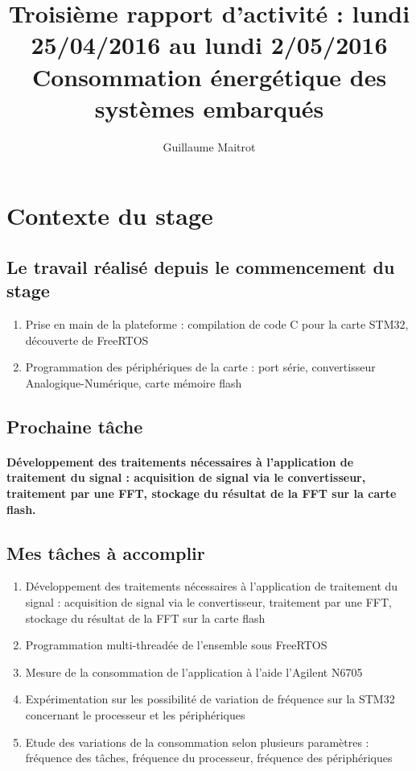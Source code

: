 \documentclass[a4paper]{article}
\title{Troisième rapport d'activité : lundi 25/04/2016 au lundi 2/05/2016 }
\author{Guillaume Maitrot}
\begin{document}
\maketitle

\begin{center}
\centering
\title{Consommation énergétique des systèmes embarqués}
\end{center}

\section{Contexte du stage}

 \subsection{Le travail réalisé depuis le commencement du stage}
 \begin{enumerate}
\item {Prise en main de la plateforme : compilation de code C pour la carte STM32, découverte de FreeRTOS}
\item {Programmation des périphériques de la carte : port série,
convertisseur Analogique-Numérique, carte mémoire flash}
\end{enumerate}

 \subsection{Prochaine tâche}
    \paragraph{Développement des traitements nécessaires à l'application de
traitement du signal : acquisition de signal via le convertisseur,
traitement par une FFT, stockage du résultat de la FFT sur la carte
flash.}
    
\subsection{Mes tâches à accomplir}
\begin{enumerate}
\item {Développement des traitements nécessaires à l'application de
traitement du signal : acquisition de signal via le convertisseur,
traitement par une FFT, stockage du résultat de la FFT sur la carte
flash}
\item { Programmation multi-threadée de l'ensemble sous FreeRTOS}
\item {Mesure de la consommation de l'application à l'aide l'Agilent
N6705}
\item {Expérimentation sur les possibilité de variation de fréquence sur la
STM32 concernant le processeur et les périphériques}
\item {Etude des variations de la consommation selon plusieurs paramètres :
fréquence des tâches, fréquence du processeur, fréquence des
périphériques}
\end{enumerate}
\end{document}
